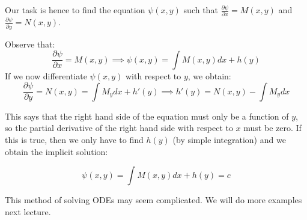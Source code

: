 Our task is hence to find the equation $\psi(x,y)$ such that $\frac{\partial \psi}{\partial x} = M(x,y)$ and $\frac{\partial \psi}{\partial y} = N(x,y)$. 

Observe that:
\[ \frac{\partial \psi}{\partial x} = M(x,y) \implies \psi(x,y) = \int M(x,y)dx + h(y) \]
If we now differentiate $\psi(x,y)$ with respect to $y$, we obtain:
\[ \frac{\partial \psi}{\partial y} = N(x,y) = \int M_y dx + h'(y) \implies h'(y) = N(x,y) - \int M_y dx \]

This says that the right hand side of the equation must only be a function of $y$, so the partial derivative of the right hand side with respect to $x$ must be zero. If this is true, then we only have to find $h(y)$ (by simple integration) and we obtain the implicit solution:

\[ \psi(x,y) = \int M(x,y) dx + h(y) = c \]

This method of solving ODEs may seem complicated. We will do more examples next lecture. 
